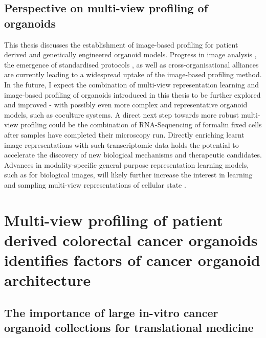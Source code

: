 \begin{flushleft}
\subsection{Perspective on multi-view profiling of organoids}
This thesis discusses the establishment of image-based profiling for patient derived and genetically engineered organoid models. Progress in image analysis \citep{chandrasekaranImagebasedProfilingDrug2021a}, the emergence of standardised protocols \citep{Bray2016-ue}, as well as cross-organisational alliances \citep{chandrasekaranJUMPCellPainting2023} are currently leading to a widespread uptake of the image-based profiling method. In the future, I expect the combination of multi-view representation learning and image-based profiling of organoids introduced in this thesis to be further explored and improved - with possibly even more complex and representative organoid models, such as coculture systems. A direct next step towards more robust multi-view profiling could be the combination of RNA-Sequencing of formalin fixed cells after samples have completed their microscopy run. Directly enriching learnt image representations with such transcriptomic data holds the potential to accelerate the discovery of new biological mechanisms and therapeutic candidates. Advances in modality-specific general purpose representation learning models, such as for biological images, will likely further increase the interest in learning and sampling multi-view representations of cellular state \citep{pfaendlerSelfsupervisedVisionTransformers2023}.



\section{Multi-view profiling of patient derived colorectal cancer organoids identifies factors of cancer organoid architecture}

\subsection{The importance of large in-vitro cancer organoid collections for translational medicine}


\end{flushleft}
